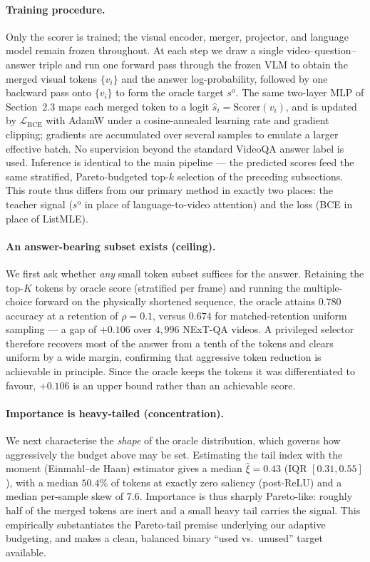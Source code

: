 \documentclass[12pt]{article}
\begin{document}
\paragraph{Training procedure.}
Only the scorer is trained; the visual encoder, merger, projector, and
language model remain frozen throughout. At each step we draw a single
video--question--answer triple and run one forward pass through the frozen
VLM to obtain the merged visual tokens $\{v_i\}$ and the answer
log-probability, followed by one backward pass onto $\{v_i\}$ to form the
oracle target $s^{\text{o}}$. The same two-layer MLP of
Section~2.3 maps each merged token to a logit $\hat{s}_i = \text{Scorer}(v_i)$,
and is updated by $\mathcal{L}_{\text{BCE}}$ with AdamW under a
cosine-annealed learning rate and gradient clipping; gradients are
accumulated over several samples to emulate a larger effective batch. No
supervision beyond the standard VideoQA answer label is used. Inference is
identical to the main pipeline --- the predicted scores feed the same
stratified, Pareto-budgeted top-$k$ selection of the preceding
subsections. This route thus differs from our primary method in exactly
two places: the teacher signal ($s^{\text{o}}$ in place of
language-to-video attention) and the loss (BCE in place of ListMLE).

\paragraph{An answer-bearing subset exists (ceiling).}
We first ask whether \emph{any} small token subset suffices for the
answer. Retaining the top-$K$ tokens by oracle score (stratified per
frame) and running the multiple-choice forward on the physically
shortened sequence, the oracle attains $0.780$ accuracy at a retention of
$\rho = 0.1$, versus $0.674$ for matched-retention uniform sampling --- a
gap of $+0.106$ over $4{,}996$ NExT-QA videos. A privileged selector
therefore recovers most of the answer from a tenth of the tokens and
clears uniform by a wide margin, confirming that aggressive token
reduction is achievable in principle. Since the oracle keeps the tokens
it was differentiated to favour, $+0.106$ is an upper bound rather than
an achievable score.

\paragraph{Importance is heavy-tailed (concentration).}
We next characterise the \emph{shape} of the oracle distribution, which
governs how aggressively the budget above may be set. Estimating the tail
index with the moment (Einmahl--de Haan) estimator gives a median
$\hat{\xi} = 0.43$ (IQR $[0.31, 0.55]$), with a median $50.4\%$ of tokens
at exactly zero saliency (post-ReLU) and a median per-sample skew of
$7.6$. Importance is thus sharply Pareto-like: roughly half of the merged
tokens are inert and a small heavy tail carries the signal. This
empirically substantiates the Pareto-tail premise underlying our adaptive
budgeting, and makes a clean, balanced binary ``used vs.\ unused'' target
available.
\end{document}
